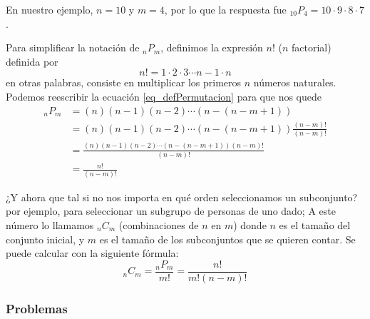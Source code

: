 \documentclass[spanish]{report}
\newcommand{\comb}[2]{ {}_{#1}C_{#2}}
\newcommand{\perm}[2]{ {}_{#1}P_{#2}}
\begin{document}
En nuestro ejemplo, $n=10$ y $m=4$, por lo que la respuesta fue $\perm{10}{4} = 10 \cdotp 9 \cdotp 8 \cdotp 7$.

Para simplificar la notación de $\perm{n}{m}$, definimos la expresión $n!$ ($n$ factorial) definida por \[ n! = 1 \cdotp 2 \cdotp 3 \cdots n-1 \cdotp n\]
en otras palabras, consiste en multiplicar los primeros $n$ números naturales.
Podemos reescribir la ecuación \ref{eq_defPermutacion} para que nos quede
\begin{align*}
\perm{n}{m} &= (n) (n-1) (n-2) \cdots (n-(n-m+1)) \\
	&= (n) (n-1) (n-2) \cdots (n-(n-m+1)) \frac{(n-m)!}{(n-m)!}\\
	&= \frac{(n) (n-1) (n-2) \cdots (n-(n-m+1)) (n-m)!}{(n-m)!}\\
	&= \frac{n!}{(n-m)!}
\end{align*}

¿Y ahora que tal si no nos importa en qué orden seleccionamos un subconjunto? por ejemplo, para seleccionar un subgrupo de personas de uno dado; %
A este número lo llamamos $\comb{n}{m}$ (combinaciones de $n$ en $m$) donde $n$ es el tamaño del conjunto inicial, y $m$ es el tamaño de los subconjuntos que se quieren contar.
Se puede calcular con la siguiente fórmula: \[\comb{n}{m} = \frac{\perm{n}{m}}{m!} = \frac{n!}{m!(n-m)!} \]

\subsubsection{Problemas}
\end{document}
